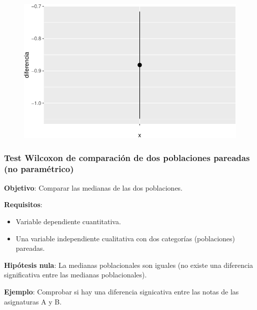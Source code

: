 \documentclass[
  a4paper,
]{scrreport}
\newenvironment{Shaded}{\begin{snugshade}}{\end{snugshade}}
\newcommand{\AttributeTok}[1]{\textcolor[rgb]{0.40,0.45,0.13}{#1}}
\newcommand{\ConstantTok}[1]{\textcolor[rgb]{0.56,0.35,0.01}{#1}}
\newcommand{\FunctionTok}[1]{\textcolor[rgb]{0.28,0.35,0.67}{#1}}
\newcommand{\NormalTok}[1]{\textcolor[rgb]{0.00,0.23,0.31}{#1}}
\newcommand{\SpecialCharTok}[1]{\textcolor[rgb]{0.37,0.37,0.37}{#1}}
\newcommand{\StringTok}[1]{\textcolor[rgb]{0.13,0.47,0.30}{#1}}
\providecommand{\tightlist}{%
  \setlength{\itemsep}{0pt}\setlength{\parskip}{0pt}}\usepackage{longtable,booktabs,array}
\theoremstyle{definition}
\theoremstyle{definition}
\theoremstyle{remark}
\begin{document}
\begin{figure}[H]

{\centering \includegraphics{./08-analisis-estadisticos_files/figure-pdf/unnamed-chunk-43-1.pdf}

}

\end{figure}

\hypertarget{test-wilcoxon-de-comparaciuxf3n-de-dos-poblaciones-pareadas-no-paramuxe9trico}{%
\subsubsection{Test Wilcoxon de comparación de dos poblaciones pareadas
(no
paramétrico)}\label{test-wilcoxon-de-comparaciuxf3n-de-dos-poblaciones-pareadas-no-paramuxe9trico}}

\textbf{Objetivo}: Comparar las medianas de las dos poblaciones.

\textbf{Requisitos}:

\begin{itemize}
\tightlist
\item
  Variable dependiente cuantitativa.
\item
  Una variable independiente cualitativa con dos categorías
  (poblaciones) pareadas.
\end{itemize}

\textbf{Hipótesis nula}: La medianas poblacionales son iguales (no
existe una diferencia significativa entre las medianas poblacionales).

\textbf{Ejemplo}: Comprobar si hay una diferencia signicativa entre las
notas de las asignaturas A y B.

\begin{Shaded}
\end{Shaded}
\end{document}

